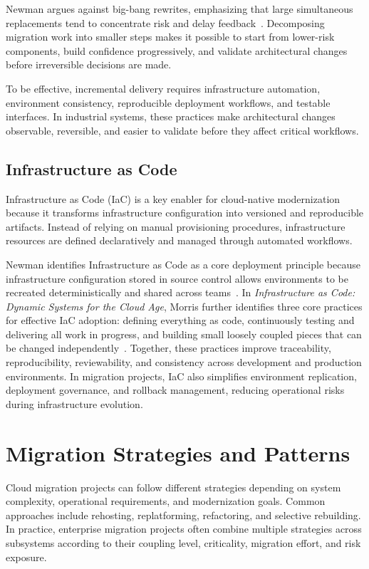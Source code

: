 Newman argues against big-bang rewrites, emphasizing that large simultaneous replacements tend to concentrate risk and delay feedback~\cite{newman2021building}. Decomposing migration work into smaller steps makes it possible to start from lower-risk components, build confidence progressively, and validate architectural changes before irreversible decisions are made.

To be effective, incremental delivery requires infrastructure automation, environment consistency, reproducible deployment workflows, and testable interfaces. In industrial systems, these practices make architectural changes observable, reversible, and easier to validate before they affect critical workflows.

\subsection{Infrastructure as Code}
Infrastructure as Code (IaC) is a key enabler for cloud-native modernization because it transforms infrastructure configuration into versioned and reproducible artifacts. Instead of relying on manual provisioning procedures, infrastructure resources are defined declaratively and managed through automated workflows.

Newman identifies Infrastructure as Code as a core deployment principle because infrastructure configuration stored in source control allows environments to be recreated deterministically and shared across teams~\cite{newman2021building}. In \emph{Infrastructure as Code: Dynamic Systems for the Cloud Age}, Morris further identifies three core practices for effective IaC adoption: defining everything as code, continuously testing and delivering all work in progress, and building small loosely coupled pieces that can be changed independently~\cite{morris2021iac}. Together, these practices improve traceability, reproducibility, reviewability, and consistency across development and production environments. In migration projects, IaC also simplifies environment replication, deployment governance, and rollback management, reducing operational risks during infrastructure evolution.

\section{Migration Strategies and Patterns}
Cloud migration projects can follow different strategies depending on system complexity, operational requirements, and modernization goals. Common approaches include rehosting, replatforming, refactoring, and selective rebuilding. In practice, enterprise migration projects often combine multiple strategies across subsystems according to their coupling level, criticality, migration effort, and risk exposure.

